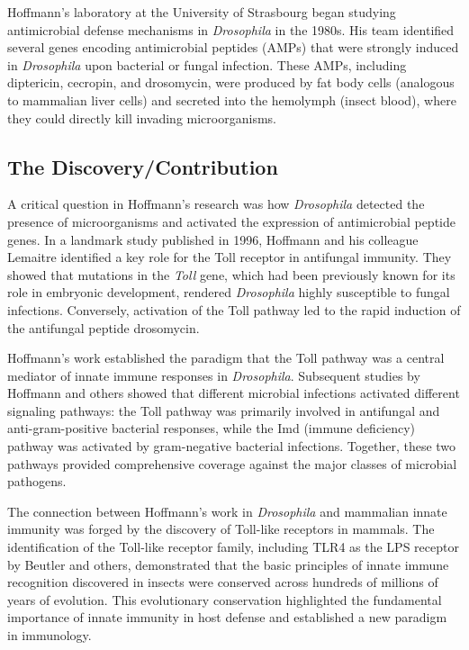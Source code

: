 Hoffmann's laboratory at the University of Strasbourg began studying antimicrobial defense mechanisms in \textit{Drosophila} in the 1980s. His team identified several genes encoding antimicrobial peptides (AMPs) that were strongly induced in \textit{Drosophila} upon bacterial or fungal infection. These AMPs, including diptericin, cecropin, and drosomycin, were produced by fat body cells (analogous to mammalian liver cells) and secreted into the hemolymph (insect blood), where they could directly kill invading microorganisms.

\subsection{The Discovery/Contribution}

A critical question in Hoffmann's research was how \textit{Drosophila} detected the presence of microorganisms and activated the expression of antimicrobial peptide genes. In a landmark study published in 1996, Hoffmann and his colleague Lemaitre identified a key role for the Toll receptor in antifungal immunity. They showed that mutations in the \textit{Toll} gene, which had been previously known for its role in embryonic development, rendered \textit{Drosophila} highly susceptible to fungal infections. Conversely, activation of the Toll pathway led to the rapid induction of the antifungal peptide drosomycin.

Hoffmann's work established the paradigm that the Toll pathway was a central mediator of innate immune responses in \textit{Drosophila}. Subsequent studies by Hoffmann and others showed that different microbial infections activated different signaling pathways: the Toll pathway was primarily involved in antifungal and anti-gram-positive bacterial responses, while the Imd (immune deficiency) pathway was activated by gram-negative bacterial infections. Together, these two pathways provided comprehensive coverage against the major classes of microbial pathogens.

The connection between Hoffmann's work in \textit{Drosophila} and mammalian innate immunity was forged by the discovery of Toll-like receptors in mammals. The identification of the Toll-like receptor family, including TLR4 as the LPS receptor by Beutler and others, demonstrated that the basic principles of innate immune recognition discovered in insects were conserved across hundreds of millions of years of evolution. This evolutionary conservation highlighted the fundamental importance of innate immunity in host defense and established a new paradigm in immunology.

